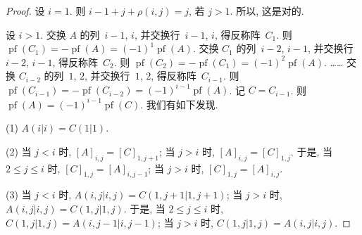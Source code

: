 \documentclass[../libro.tex]{subfiles}
\begin{document}
\begin{proof}
    设 \(i = 1\).
    则 \(i - 1 + j + \rho(i, j) = j\), 若 \(j > 1\).
    所以, 这是对的.

    设 \(i > 1\).
    交换 \(A\) 的列~\(i-1\), \(i\),
    并交换行~\(i-1\), \(i\),
    得反称阵~\(C_1\).
    则 \(\operatorname{pf} {(C_1)}
        = -\operatorname{pf} {(A)}
    = (-1)^1 \operatorname{pf} {(A)}\).
    交换 \(C_1\) 的列~\(i-2\), \(i-1\),
    并交换行~\(i-2\), \(i-1\),
    得反称阵~\(C_2\).
    则 \(\operatorname{pf} {(C_2)}
        = -\operatorname{pf} {(C_1)}
    = (-1)^2 \operatorname{pf} {(A)}\).
    ……
    交换 \(C_{i-2}\) 的列~\(1\), \(2\),
    并交换行~\(1\), \(2\),
    得反称阵~\(C_{i-1}\).
    则 \(\operatorname{pf} {(C_{i-1})}
        = -\operatorname{pf} {(C_{i-2})}
    = (-1)^{i-1} \operatorname{pf} {(A)}\).
    记 \(C = C_{i-1}\).
    则 \(\operatorname{pf} {(A)}
    = (-1)^{i-1} \operatorname{pf} {(C)}\).
    我们有如下发现.

    (1)
    \(A(i|i) = C(1|1)\).

    (2)
    当 \(j < i\) 时,
    \([A]_{i,j} = [C]_{1,j+1}\);
    当 \(j > i\) 时,
    \([A]_{i,j} = [C]_{1,j}\).
    于是,
    当 \(2 \leq j \leq i\) 时,
    \([C]_{1,j} = [A]_{i,j-1}\);
    当 \(j > i\) 时,
    \([C]_{1,j} = [A]_{i,j}\).

    (3)
    当 \(j < i\) 时,
    \(A({i,j}|{i,j}) = C({1,j+1}|{1,j+1})\);
    当 \(j > i\) 时,
    \(A({i,j}|{i,j}) = C({1,j}|{1,j})\).
    于是,
    当 \(2 \leq j \leq i\) 时,
    \(C({1,j}|{1,j}) = A({i,j-1}|{i,j-1})\);
    当 \(j > i\) 时,
    \(C({1,j}|{1,j}) = A({i,j}|{i,j})\).


\end{proof}
\end{document}
